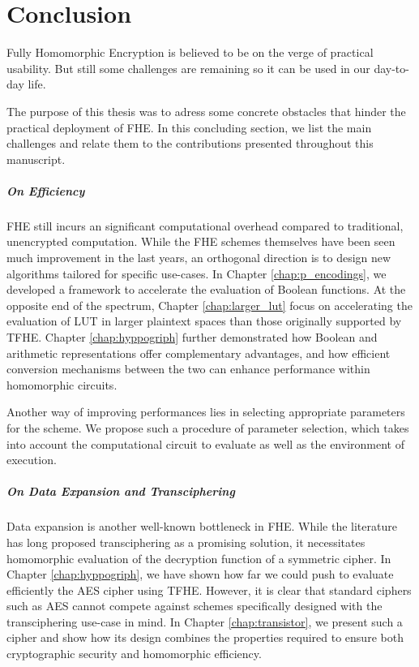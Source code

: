 \chapter*{Conclusion}


Fully Homomorphic Encryption is believed to be on the verge of practical usability. But still some challenges are remaining so it can be used in our day-to-day life.

The purpose of this thesis was to adress some concrete obstacles that hinder the practical deployment of FHE. In this concluding section, we list the main challenges and relate them to the contributions presented throughout this manuscript.

\paragraph{On Efficiency}

FHE still incurs an significant computational overhead compared to traditional, unencrypted computation. While the FHE schemes themselves have been seen much improvement in the last years, an orthogonal direction is to design new algorithms tailored for specific use-cases. In Chapter \ref{chap:p_encodings}, we developed a framework to accelerate the evaluation of Boolean functions. At the opposite end of the spectrum, Chapter \ref{chap:larger_lut} focus on accelerating the evaluation of LUT in larger plaintext spaces than those originally supported by TFHE. Chapter \ref{chap:hyppogriph} further demonstrated how Boolean and arithmetic representations offer complementary advantages, and how efficient conversion mechanisms  between the two can enhance performance within homomorphic circuits. 

Another way of improving performances lies in selecting appropriate parameters for the scheme. We propose such a procedure of parameter selection, which takes into account the computational circuit to evaluate as well as the environment of execution.




\paragraph{On Data Expansion and Transciphering}


Data expansion is another well-known bottleneck in FHE. While the literature has long proposed transciphering as a promising solution, it necessitates homomorphic evaluation of the decryption function of a symmetric cipher. In Chapter \ref{chap:hyppogriph}, we have shown how far we could push to evaluate efficiently the AES cipher using TFHE. However, it is clear that standard ciphers such as AES cannot compete against schemes specifically designed with the transciphering use-case in mind. In Chapter \ref{chap:transistor}, we present such a cipher and show how its design combines the properties required to ensure both cryptographic security and homomorphic efficiency. 




